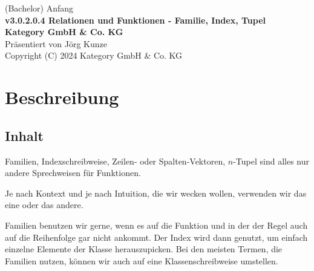 \documentclass[a4paper]{amsart}
\theoremstyle{definition}
\begin{document}
\begin{titlepage}
\centering
{\huge
(Bachelor) Anfang\\[1cm]
\textbf{v3.0.2.0.4 Relationen und Funktionen - Familie, Index, Tupel}
}\\[1cm]

\textbf{Kategory GmbH \& Co. KG}\\
Präsentiert von Jörg Kunze\\
Copyright (C) 2024 Kategory GmbH \& Co. KG

\end{titlepage}

%

\newpage

\section*{Beschreibung}

\subsection*{Inhalt}
Familien, Indexschreibweise, Zeilen- oder Spalten-Vektoren, $n$-Tupel sind alles nur andere Sprechweisen für Funktionen.

Je nach Kontext und je nach Intuition, die wir wecken wollen, verwenden wir das eine oder das andere.

Familien benutzen wir gerne, wenn es auf die Funktion und in der der Regel auch auf die Reihenfolge gar nicht ankommt. Der Index wird dann genutzt, um einfach einzelne Elemente der Klasse herauszupicken. Bei den meisten Termen, die Familien nutzen, können wir auch auf eine Klassenschreibweise umstellen.
\end{document}
